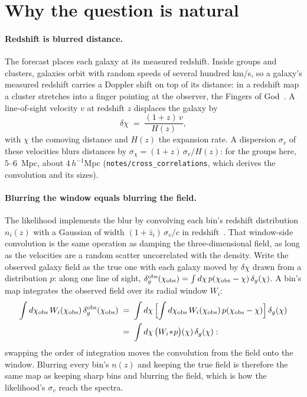 \documentclass[11pt]{article}
\newcommand{\sv}{\sigma_v}
\newcommand{\us}{\_\allowbreak}
\begin{document}
\section{Why the question is natural}
\label{sec:why}

\paragraph{Redshift is blurred distance.}
The forecast places each galaxy at its measured redshift.  Inside
groups and clusters, galaxies orbit with random speeds of several
hundred km/s, so a galaxy's measured redshift carries a Doppler shift
on top of its distance: in a redshift map a cluster stretches into a
finger pointing at the observer, the Fingers of
God~\cite{Jackson1972}.  A line-of-sight velocity $v$ at redshift $z$
displaces the galaxy by
\begin{equation}
  \delta\chi \;=\; \frac{(1 + z)\,v}{H(z)} ,
  \label{eq:conversion}
\end{equation}
with $\chi$ the comoving distance and $H(z)$ the expansion rate.  A
dispersion $\sv$ of these velocities blurs distances by
$\sigma_\chi = (1 + z)\,\sv/H(z)$: for the groups here, $5$--$6$~Mpc,
about $4\,h^{-1}$Mpc (\texttt{notes/cross\us correlations}, which
derives the convolution and its sizes).

\paragraph{Blurring the window equals blurring the field.}
The likelihood implements the blur by convolving each bin's redshift
distribution $n_i(z)$ with a Gaussian of width
$(1 + \bar{z}_i)\,\sv/c$ in redshift~\cite{GrasshornGebhardt2020}.
That window-side convolution is the same operation as damping the
three-dimensional field, as long as the velocities are a random
scatter uncorrelated with the density.  Write the observed galaxy
field as the true one with each galaxy moved by $\delta\chi$ drawn
from a distribution $p$: along one line of sight,
$\delta_g^{\rm obs}(\chi_{\rm obs}) = \int d\chi\,
p(\chi_{\rm obs} - \chi)\,\delta_g(\chi)$.  A bin's map integrates the
observed field over its radial window $W_i$:
\begin{align}
  \int d\chi_{\rm obs}\, W_i(\chi_{\rm obs})\,
  \delta_g^{\rm obs}(\chi_{\rm obs})
  \;&=\; \int d\chi\,\Bigl[\int d\chi_{\rm obs}\,
  W_i(\chi_{\rm obs})\, p(\chi_{\rm obs} - \chi)\Bigr]\,
  \delta_g(\chi)
  \nonumber\\
  \;&=\; \int d\chi\,\bigl(W_i \!*\! p\bigr)(\chi)\,
  \delta_g(\chi) :
  \label{eq:swap}
\end{align}
swapping the order of integration moves the convolution from the field
onto the window.  Blurring every bin's $n(z)$ and keeping the true
field is therefore the same map as keeping sharp bins and blurring the
field, which is how the likelihood's $\sv$ reach the spectra.
\end{document}
